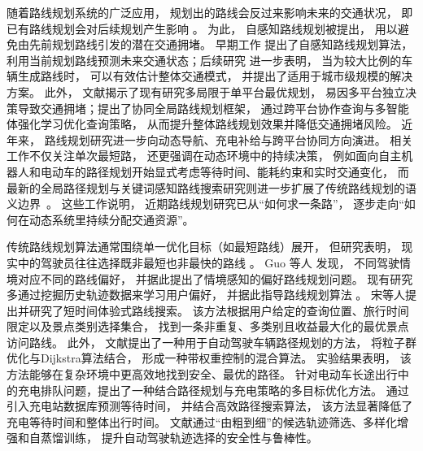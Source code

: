 随着路线规划系统的广泛应用， 规划出的路线会反过来影响未来的交通状况， 即已有路线规划会对后续规划产生影响 。 为此， 自感知路线规划被提出， 用以避免由先前规划路线引发的潜在交通拥堵。 早期工作  提出了自感知路线规划算法， 利用当前规划路线预测未来交通状态；后续研究  进一步表明， 当为较大比例的车辆生成路线时， 可以有效估计整体交通模式， 并提出了适用于城市级规模的解决方案。 此外， 文献揭示了现有研究多局限于单平台最优规划， 易因多平台独立决策导致交通拥堵；提出了协同全局路线规划框架， 通过跨平台协作查询与多智能体强化学习优化查询策略， 从而提升整体路线规划效果并降低交通拥堵风险。 近年来， 路线规划研究进一步向动态导航、充电补给与跨平台协同方向演进。 相关工作不仅关注单次最短路， 还更强调在动态环境中的持续决策， 例如面向自主机器人和电动车的路径规划开始显式考虑等待时间、能耗约束和实时交通变化， 而最新的全局路径规划与关键词感知路线搜索研究则进一步扩展了传统路线规划的语义边界~。 这些工作说明， 近期路线规划研究已从“如何求一条路”， 逐步走向“如何在动态系统里持续分配交通资源”。


传统路线规划算法通常围绕单一优化目标（如最短路线）展开， 但研究表明， 现实中的驾驶员往往选择既非最短也非最快的路线 。 Guo 等人  发现， 不同驾驶情境对应不同的路线偏好， 并据此提出了情境感知的偏好路线规划问题。 现有研究多通过挖掘历史轨迹数据来学习用户偏好， 并据此指导路线规划算法 。 宋等人提出并研究了短时间体验式路线搜索。 该方法根据用户给定的查询位置、旅行时间限定以及景点类别选择集合， 找到一条非重复、多类别且收益最大化的最优景点访问路线。 此外， 文献提出了一种用于自动驾驶车辆路径规划的方法， 将粒子群优化与Dijkstra算法结合， 形成一种带权重控制的混合算法。 实验结果表明， 该方法能够在复杂环境中更高效地找到安全、最优的路径。 针对电动车长途出行中的充电排队问题，提出了一种结合路径规划与充电策略的多目标优化方法。 通过引入充电站数据库预测等待时间， 并结合高效路径搜索算法， 该方法显著降低了充电等待时间和整体出行时间。 文献通过“由粗到细”的候选轨迹筛选、多样化增强和自蒸馏训练， 提升自动驾驶轨迹选择的安全性与鲁棒性。



